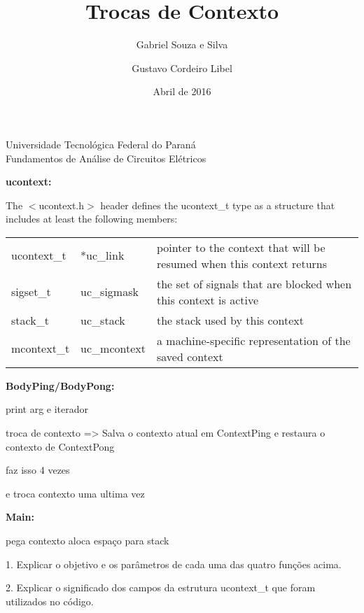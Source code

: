 \documentclass[12pt]{article}
\title{Trocas de Contexto} %
\author{Gabriel Souza e Silva \and Gustavo Cordeiro Libel} %
\date{Abril de 2016} %
\begin{document}
\maketitle %
\begin{center}
	Universidade Tecnológica Federal do Paraná\\
	Fundamentos de Análise de Circuitos Elétricos
\end{center}


\textbf{\large ucontext:}

The $<$ucontext.h$>$ header defines the ucontext\_t type as a structure that includes at least the following members:

\begin{table}[H]
	\centering
	\label{my-label}
	\begin{tabular}{|l|l|l|}
		\hline 
		ucontext\_t & *uc\_link    & pointer to the context that will be resumed when this context returns \\
		sigset\_t   & uc\_sigmask  & the set of signals that are blocked when this context is active       \\
		stack\_t    & uc\_stack    & the stack used by this context                                        \\
		mcontext\_t & uc\_mcontext & a machine-specific representation of the saved context          \\
		\hline      
	\end{tabular}
\end{table}


\textbf{\large BodyPing/BodyPong:}

print arg e iterador

troca de contexto => Salva o contexto atual em ContextPing e restaura o contexto de ContextPong

faz isso 4 vezes

e troca contexto uma ultima vez

\textbf{\large Main:}

pega contexto
aloca espaço para stack


1. Explicar o objetivo e os parâmetros de cada uma das quatro funções acima.

2. Explicar o significado dos campos da estrutura ucontext\_t que foram utilizados no código.
\end{document}
